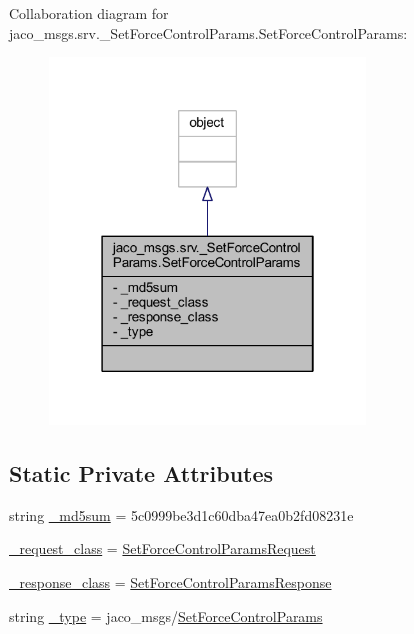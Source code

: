 Collaboration diagram for jaco\+\_\+msgs.\+srv.\+\_\+\+Set\+Force\+Control\+Params.\+Set\+Force\+Control\+Params\+:
\nopagebreak
\begin{figure}[H]
\begin{center}
\leavevmode
\includegraphics[width=238pt]{d6/d1c/classjaco__msgs_1_1srv_1_1__SetForceControlParams_1_1SetForceControlParams__coll__graph}
\end{center}
\end{figure}
\subsection*{Static Private Attributes}
\begin{DoxyCompactItemize}
\item 
string \hyperlink{classjaco__msgs_1_1srv_1_1__SetForceControlParams_1_1SetForceControlParams_abd09ede84f0e700534b100524f3b36a0}{\+\_\+md5sum} = \textquotesingle{}5c0999be3d1c60dba47ea0b2fd08231e\textquotesingle{}
\item 
\hyperlink{classjaco__msgs_1_1srv_1_1__SetForceControlParams_1_1SetForceControlParams_a468404a621d79c3dd922c899953d6fe2}{\+\_\+request\+\_\+class} = \hyperlink{classjaco__msgs_1_1srv_1_1__SetForceControlParams_1_1SetForceControlParamsRequest}{Set\+Force\+Control\+Params\+Request}
\item 
\hyperlink{classjaco__msgs_1_1srv_1_1__SetForceControlParams_1_1SetForceControlParams_aba8d3824eec5d715e27aa064b779955c}{\+\_\+response\+\_\+class} = \hyperlink{classjaco__msgs_1_1srv_1_1__SetForceControlParams_1_1SetForceControlParamsResponse}{Set\+Force\+Control\+Params\+Response}
\item 
string \hyperlink{classjaco__msgs_1_1srv_1_1__SetForceControlParams_1_1SetForceControlParams_ab319402c6ef2c9f2b95ff003c1b9b29a}{\+\_\+type} = \textquotesingle{}jaco\+\_\+msgs/\hyperlink{classjaco__msgs_1_1srv_1_1__SetForceControlParams_1_1SetForceControlParams}{Set\+Force\+Control\+Params}\textquotesingle{}
\end{DoxyCompactItemize}


